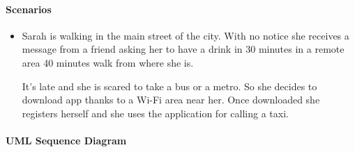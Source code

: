 \paragraph{Scenarios}
\begin{itemize}
	\item Sarah is walking in the main street of the city. With no notice she receives a message from a friend asking her to have a drink in 30 minutes in a remote area 40 minutes walk from where she is.\par It's late and she is scared to take a bus or a metro. So she decides to download \myTaxiService{} app thanks to a Wi-Fi area near her. Once downloaded she registers herself and she uses the application for calling a taxi.
\end{itemize}
\paragraph{UML Sequence Diagram}
